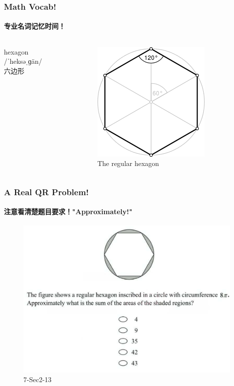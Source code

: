 \documentclass[
	11pt, %
]{beamer}
\begin{document}
\begin{frame}
	\frametitle{Math Vocab!} %
	\framesubtitle{专业名词记忆时间！}
	

	\begin{columns}[t] 
	\begin{column}{0.4\textwidth} %
		{\Huge hexagon}\\
		{\LARGE /ˈheksəˌɡän/\\
			\bigskip\bigskip
		六边形}
	\end{column}
	\begin{column}{0.6\textwidth} %
		\begin{figure}
			\includegraphics[width=0.8\linewidth]{hexagon.png}
			\caption{The regular hexagon}
		\end{figure}	
	\end{column}
\end{columns}

\end{frame}



\begin{frame}
	\frametitle{A Real QR Problem!}
	\framesubtitle{注意看清楚题目要求！"Approximately!"}
	\begin{figure}
		\includegraphics[width=0.8\linewidth]{Hexagon_Triangle_Example_Question1.png}
		\caption{7-Sec2-13}
	\end{figure}
\end{frame}
\end{document}
